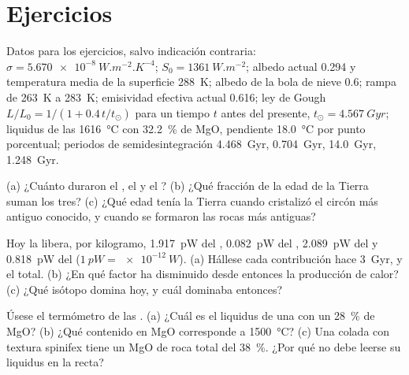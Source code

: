\section*{Ejercicios}\label{sec:b2:precambrian-earth:exercises}

Datos para los ejercicios, salvo indicación contraria: $\sigma = \qty{5.670e-8}{W.m^{-2}.K^{-4}}$;
$S_0 = \qty{1361}{W.m^{-2}}$; albedo actual 0.294 y temperatura media de la superficie \qty{288}{K};
albedo de la bola de nieve 0.6; rampa de \qty{263}{K} a \qty{283}{K}; emisividad efectiva actual
0.616; ley de Gough $L/L_0 = 1/(1 + 0.4\,t/t_\odot)$ para un tiempo $t$ antes del presente, $t_\odot =
\qty{4.567}{Gyr}$; liquidus de las  \qty{1616}{\celsius} con \qty{32.2}{\percent} de MgO,
pendiente \qty{18.0}{\celsius} por punto porcentual; periodos de semidesintegración  \qty{4.468}{Gyr}, 
\qty{0.704}{Gyr},  \qty{14.0}{Gyr},  \qty{1.248}{Gyr}.

\begin{exercise}[$\star$]\label{exo:b2:precambrian-earth:1}
(a) ¿Cuánto duraron el , el  y el ? (b) ¿Qué fracción de la edad
de la Tierra suman los tres? (c) ¿Qué edad tenía la Tierra cuando cristalizó el circón más antiguo conocido,
y cuando se formaron las rocas más antiguas?
\end{exercise}

\begin{exercise}[$\star$]\label{exo:b2:precambrian-earth:2}
Hoy la  libera, por kilogramo, \qty{1.917}{pW} del ,
\qty{0.082}{pW} del , \qty{2.089}{pW} del  y \qty{0.818}{pW} del
 ($\qty{1}{pW} = \qty{e-12}{W}$). (a) Hállese cada contribución hace \qty{3}{Gyr}, y
el total. (b) ¿En qué factor ha disminuido desde entonces la producción de calor? (c) ¿Qué isótopo domina
hoy, y cuál dominaba entonces?
\end{exercise}

\begin{exercise}[$\star$]\label{exo:b2:precambrian-earth:3}
Úsese el termómetro de las . (a) ¿Cuál es el liquidus de una  con un
\qty{28}{\percent} de MgO? (b) ¿Qué contenido en MgO corresponde a \qty{1500}{\celsius}? (c) Una
colada con textura spinifex tiene un MgO de roca total del \qty{38}{\percent}. ¿Por qué no debe leerse
su liquidus en la recta?
\end{exercise}

